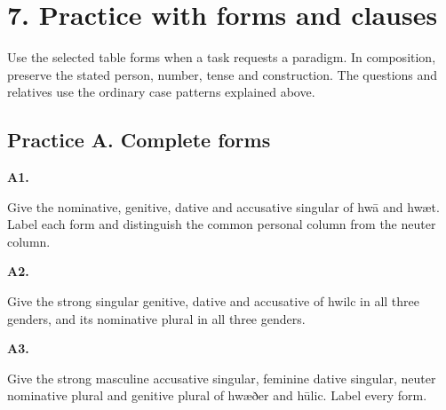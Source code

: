 \section*{7. Practice with forms and clauses}

Use the selected table forms when a task requests a paradigm. In composition, preserve the stated person, number, tense and construction. The questions and relatives use the ordinary case patterns explained above.

\subsection*{Practice A. Complete forms}

\par\begin{minipage}{\linewidth}\raggedright
\textbf{A1.}

Give the nominative, genitive, dative and accusative singular of hwā and hwæt. Label each form and distinguish the common personal column from the neuter column.

\end{minipage}\par\addvspace{4pt}

\par\begin{minipage}{\linewidth}\raggedright
\textbf{A2.}

Give the strong singular genitive, dative and accusative of hwilc in all three genders, and its nominative plural in all three genders.

\end{minipage}\par\addvspace{4pt}

\par\begin{minipage}{\linewidth}\raggedright
\textbf{A3.}

Give the strong masculine accusative singular, feminine dative singular, neuter nominative plural and genitive plural of hwæðer and hūlic. Label every form.

\end{minipage}\par\addvspace{4pt}


